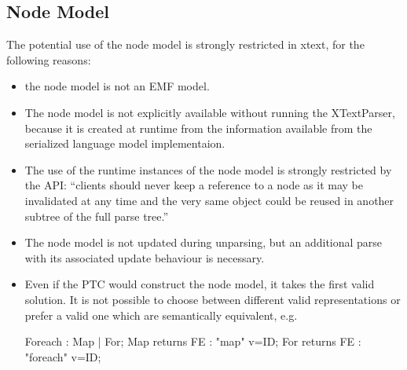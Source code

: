 \subsection{Node Model}
The potential use of the node model is strongly restricted in xtext, for the following reasons:
\begin{itemize}
	\item the node model is not an EMF model. 
	\item The node model is not explicitly available without running the XTextParser, because it is created at runtime from the information available from the serialized language model implementaion. 
	\item The use of the runtime instances of the node model is strongly restricted by the API: ``clients should never keep a reference to a node as it may be invalidated at any time and the very same object could be reused in another subtree of the full parse tree.''\cite{XTextAPI}
	\item The node model is not updated during unparsing, but an additional parse with its associated update behaviour is necessary.
	\item Even if the PTC would construct the node model, it takes the first valid solution. It is not possible to choose between different valid representations or prefer a valid one which are semantically equivalent, e.g.\begin{xtxt}
Foreach 		: 	Map | For;
Map returns FE  	:  	"map" 		v=ID;
For returns FE  	: 	"foreach"	v=ID;
\end{xtxt}
\end{itemize}